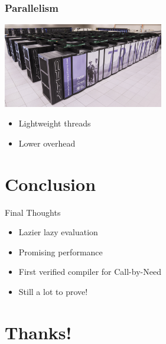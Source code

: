 \documentclass[14pt]{beamer}
\begin{document}
\begin{frame}
\frametitle{Parallelism}
\includegraphics[width=7cm]{trinity}
\centering
\begin{itemize}
\item Lightweight threads
\item Lower overhead
\end{itemize}
\end{frame}

\section{Conclusion}
\begin{frame}{Final Thoughts}
\begin{itemize}
\item Lazier lazy evaluation
\item Promising performance 
\item First verified compiler for Call-by-Need
\item Still a lot to prove!
\end{itemize}
\end{frame}

\section{Thanks!}

%
%
\end{document}
